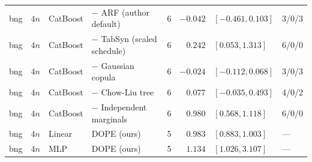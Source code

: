 \begin{longtable}{lllllrll}
bng & $4n$ & CatBoost & $-$ ARF (author default) & 6 & $-0.042$ & $[-0.461, 0.103]$ & 3/0/3 \\
bng & $4n$ & CatBoost & $-$ TabSyn (scaled schedule) & 6 & $0.242$ & $[0.053, 1.313]$ & 6/0/0 \\
bng & $4n$ & CatBoost & $-$ Gaussian copula & 6 & $-0.024$ & $[-0.112, 0.068]$ & 3/0/3 \\
bng & $4n$ & CatBoost & $-$ Chow-Liu tree & 6 & $0.077$ & $[-0.035, 0.493]$ & 4/0/2 \\
bng & $4n$ & CatBoost & $-$ Independent marginals & 6 & $0.980$ & $[0.568, 1.118]$ & 6/0/0 \\
bng & $4n$ & Linear & DOPE (ours) & 5 & $0.983$ & $[0.883, 1.003]$ & --- \\
bng & $4n$ & MLP & DOPE (ours) & 5 & $1.134$ & $[1.026, 3.107]$ & --- \\
\bottomrule
\end{longtable}
